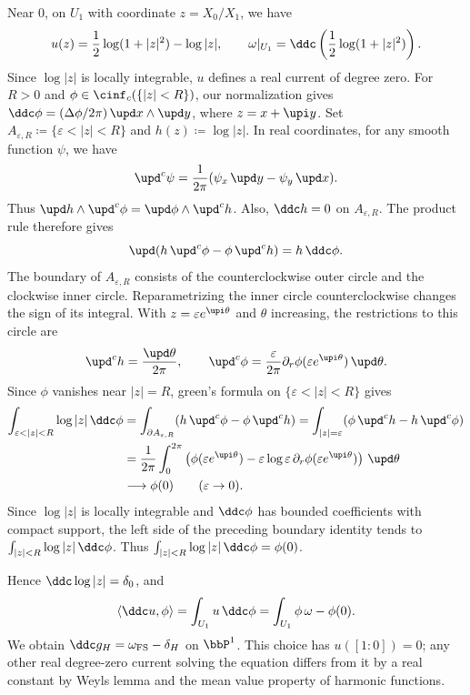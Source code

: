 \begin{example}[label=\labelNFM{eg:green-divisor-and-forms-of-line-in-pn}, status=draft, tag=0000000]
  Near $0$, on $U_1$ with coordinate $z = X_0/X_1$, we have
  \[ u(z) = \frac{1}{2} \log(1 + |z|^2) - \log|z|, \qquad \omega|_{U_1} = \ddc\left(\frac{1}{2} \log(1 + |z|^2)\right). \]
  Since $\log|z|$ is locally integrable, $u$ defines a real current of degree zero.
  For $R > 0$ and $\phi \in \cinf_c(\{|z| < R\})$,
  our normalization gives $\ddc\phi = (\Delta\phi/2\pi)\,\upd x \wedge \upd y$, where $z = x + \upi y$.
  Set $A_{\varepsilon,R} \coloneqq \{\varepsilon < |z| < R\}$ and $h(z) \coloneqq \log|z|$.
  In real coordinates, for any smooth function $\psi$, we have
    \[ \upd^c\psi = \frac{1}{2\pi}(\psi_x\,\upd y - \psi_y\,\upd x). \]
    Thus $\upd h \wedge \upd^c\phi = \upd\phi \wedge \upd^c h$.
    Also, $\ddc h = 0$ on $A_{\varepsilon,R}$.
    The product rule therefore gives
    \[ \upd(h\,\upd^c\phi - \phi\,\upd^c h) = h\,\ddc\phi. \]
    The boundary of $A_{\varepsilon,R}$ consists of the counterclockwise outer circle and the clockwise inner circle.
    Reparametrizing the inner circle counterclockwise changes the sign of its integral.
    With $z = \varepsilon e^{\upi\theta}$ and $\theta$ increasing, the restrictions to this circle are
    \[ \upd^c h = \frac{\upd\theta}{2\pi}, \qquad \upd^c\phi = \frac{\varepsilon}{2\pi}\partial_r\phi(\varepsilon e^{\upi\theta})\,\upd\theta. \]
  Since $\phi$ vanishes near $|z| = R$,
  green's formula on $\{\varepsilon < |z| < R\}$ gives
  \begin{align*}
    \int_{\varepsilon < |z| < R} \log|z|\,\ddc\phi & = \int_{\partial A_{\varepsilon,R}} (h\,\upd^c\phi - \phi\,\upd^c h) = \int_{|z| = \varepsilon} (\phi\,\upd^c h - h\,\upd^c\phi) \\
    & = \frac{1}{2\pi} \int_0^{2\pi} \left(\phi(\varepsilon e^{\upi\theta}) - \varepsilon \log\varepsilon\,\partial_r\phi(\varepsilon e^{\upi\theta})\right)\,\upd\theta \\
    & \longrightarrow \phi(0) \qquad (\varepsilon \to 0).
  \end{align*}
  Since $\log|z|$ is locally integrable and $\ddc\phi$ has bounded coefficients with compact support,
  the left side of the preceding boundary identity tends to $\int_{|z| < R}\log|z|\,\ddc\phi$.
  Thus $\int_{|z| < R}\log|z|\,\ddc\phi = \phi(0)$.

  Hence $\ddc\log|z| = \delta_0$, and
  \[ \langle \ddc u,\phi\rangle = \int_{U_1} u\,\ddc\phi = \int_{U_1} \phi\,\omega - \phi(0). \]
  We obtain $\ddc g_H = \omega_{\mathrm{FS}} - \delta_H$ on $\bbP^1$.
  This choice has $u([1:0]) = 0$; any other real degree-zero current solving the equation differs from it by a real constant by Weyl\textquotesingle s lemma and the mean value property of harmonic functions.

\end{example}

